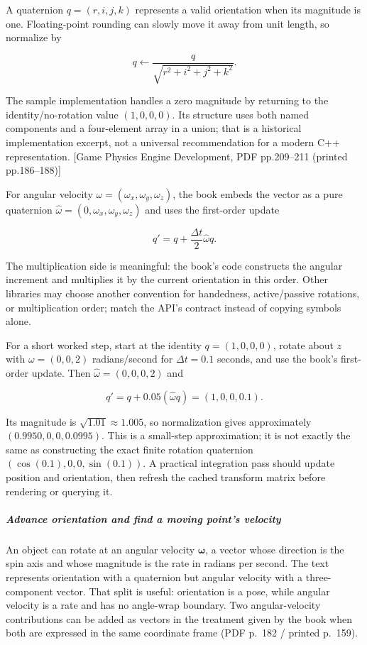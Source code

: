A quaternion \(q=(r,i,j,k)\) represents a valid orientation when its magnitude is one. Floating-point rounding can slowly move it away from unit length, so normalize by

\[
q\leftarrow\frac{q}{\sqrt{r^2+i^2+j^2+k^2}}.
\]

The sample implementation handles a zero magnitude by returning to the identity/no-rotation value \((1,0,0,0)\). Its structure uses both named components and a four-element array in a union; that is a historical implementation excerpt, not a universal recommendation for a modern C++ representation. {[}Game Physics Engine Development, PDF pp.209--211 (printed pp.186--188){]}

For angular velocity \(\omega=(\omega_x,\omega_y,\omega_z)\), the book embeds the vector as a pure quaternion \(\hat\omega=(0,\omega_x,\omega_y,\omega_z)\) and uses the first-order update

\[
q' = q+\frac{\Delta t}{2}\hat\omega q.
\]

The multiplication side is meaningful: the book's code constructs the angular increment and multiplies it by the current orientation in this order. Other libraries may choose another convention for handedness, active/passive rotations, or multiplication order; match the API's contract instead of copying symbols alone.

For a short worked step, start at the identity \(q=(1,0,0,0)\), rotate about \(z\) with \(\omega=(0,0,2)\) radians/second for \(\Delta t=0.1\) seconds, and use the book's first-order update. Then \(\hat\omega=(0,0,0,2)\) and

\[
q'=q+0.05(\hat\omega q)=(1,0,0,0.1).
\]

Its magnitude is \(\sqrt{1.01}\approx1.005\), so normalization gives approximately \((0.9950,0,0,0.0995)\). This is a small-step approximation; it is not exactly the same as constructing the exact finite rotation quaternion \(({\cos(0.1)},0,0,{\sin(0.1)})\). A practical integration pass should update position and orientation, then refresh the cached transform matrix before rendering or querying it.

\subparagraph{Advance orientation and find a moving point's velocity}\label{advance-orientation-and-find-a-moving-points-velocity}

An object can rotate at an angular velocity \(\boldsymbol{\omega}\), a vector whose direction is the spin axis and whose magnitude is the rate in radians per second. The text represents orientation with a quaternion but angular velocity with a three-component vector. That split is useful: orientation is a pose, while angular velocity is a rate and has no angle-wrap boundary. Two angular-velocity contributions can be added as vectors in the treatment given by the book when both are expressed in the same coordinate frame (PDF p.~182 / printed p.~159).


